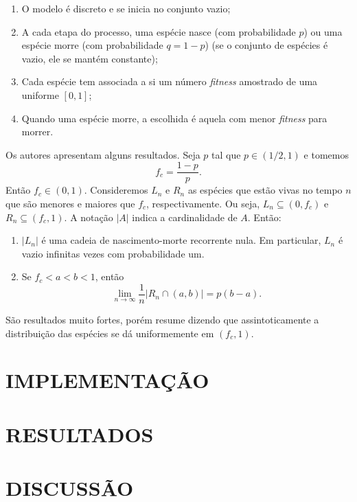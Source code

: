 \documentclass[10pt,brazil,english]{article}
\begin{document}
        \renewcommand{\theenumi}{\roman{enumi}} 
        \begin{enumerate}
            \item O modelo é discreto e se inicia no conjunto vazio;
            \item A cada etapa do processo, uma espécie nasce (com probabilidade $p$) ou uma espécie morre (com probabilidade $q = 1 - p$) (se o conjunto de espécies é vazio, ele se mantém constante);
            \item Cada espécie tem associada a si um número \textit{fitness} amostrado de uma uniforme $[0, 1]$;
            \item Quando uma espécie morre, a escolhida é aquela com menor \textit{fitness} para morrer.
        \end{enumerate}

        Os autores apresentam alguns resultados. Seja $p$ tal que $p \in (1/2, 1)$ e tomemos $$f_c = \frac{1 - p}{p}\textrm{.}$$
        Então $f_c \in (0, 1)$.
        Consideremos $L_n$ e $R_n$ as espécies que estão vivas no tempo $n$ que são menores e maiores que $f_c$, respectivamente. Ou seja, $L_n \subseteq (0, f_c)$ e $R_n \subseteq (f_c, 1)$. A notação $|A|$ indica a cardinalidade de $A$. Então:

        \begin{theorem} \cite{guiol2009stochastic}
            \renewcommand{\theenumi}{\alph{enumi}} 
            \begin{enumerate}
                \item $|L_n|$ é uma cadeia de nascimento-morte recorrente nula. Em particular, $L_n$ é vazio infinitas vezes com probabilidade um.
                \item Se $f_c < a < b < 1$, então $$\lim_{n \to \infty} \dfrac{1}{n} |R_n \cap (a, b)| = p(b - a) \textrm{.}$$
            \end{enumerate}
        \end{theorem}

        São resultados muito fortes, porém  resume dizendo que assintoticamente a distribuição das espécies se dá uniformemente em $(f_c, 1)$.

    \section{\uppercase{Implementação}}

    \section{\uppercase{Resultados}}

    \section{\uppercase{Discussão}}

    
    
\end{document}
